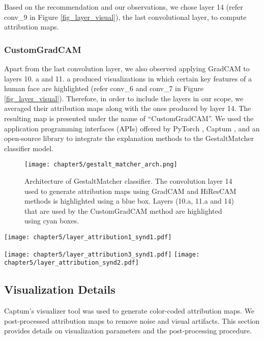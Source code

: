 \documentclass[../report.tex]{subfiles}
\begin{document}
	Based on the recommendation and our observations, we chose layer 14 (refer conv\_9 in Figure \ref{fig_layer_visual}), the last convolutional layer, to compute attribution maps.\\
	\subsubsection{CustomGradCAM}
	Apart from the last convolution layer, we also observed applying GradCAM to layers 10. a and 11. a produced visualizations in which certain key features of a human face are highlighted (refer conv\_6 and conv\_7 in Figure \ref{fig_layer_visual}). Therefore, in order to include the layers in our scope, we averaged their attribution maps along with the ones produced by layer 14. The resulting map is presented under the name of \enquote{CustomGradCAM}. We used the application programming interfaces (APIs) offered by PyTorch \cite{paszke2019pytorch}, Captum \cite{kokhlikyan2020captum}, and an open-source library \cite{jacobgilpytorchcam} to integrate the explanation methods to the GestaltMatcher classifier model.
	\begin{figure}[H]
		\hspace*{1.0cm}      
		\texttt{[image: chapter5/gestalt\_matcher\_arch.png]}
		\caption[Architecture of GestaltMatcher classifier]{Architecture of GestaltMatcher classifier. The convolution layer 14 used to generate attribution maps using GradCAM and HiResCAM methods is highlighted using a blue box. Layers (10.a, 11.a and 14) that are used by the CustomGradCAM method are highlighted using cyan boxes. }
		\label{fig_arch_gest_matcher}
	\end{figure}
	\begin{sidewaysfigure}
	\texttt{[image: chapter5/layer\_attribution1\_synd1.pdf]}
	
	\texttt{[image: chapter5/layer\_attribution3\_synd1.pdf]}
	\label{fig_gm_pipeline}	      
	\texttt{[image: chapter5/layer\_attribution\_synd2.pdf]}
	\caption{Layer-wise visualization of attribution maps generated by GradCAM and HiResCAM methods.}
	\label{fig_layer_visual}
\end{sidewaysfigure}
	\subsection{Visualization Details}
	 \noindent
	 Captum's visualizer tool was used to generate color-coded attribution maps. We post-processed attribution maps to remove noise and visual artifacts. This section provides details on visualization parameters and the post-processing procedure.
\end{document}

